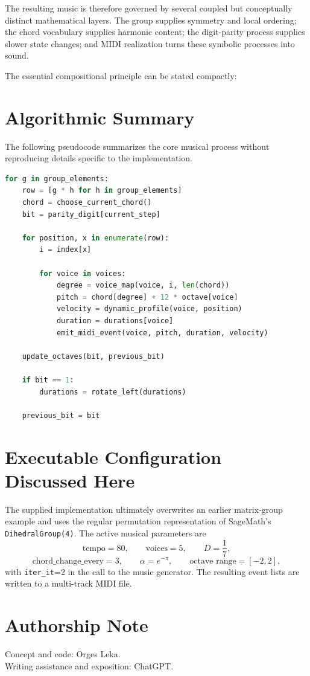 \documentclass[11pt,a4paper]{article}
\begin{document}
The resulting music is therefore governed by several coupled but conceptually distinct mathematical layers. The group supplies symmetry and local ordering; the chord vocabulary supplies harmonic content; the digit-parity process supplies slower state changes; and MIDI realization turns these symbolic processes into sound.

The essential compositional principle can be stated compactly:
\begin{center}
\end{center}

\appendix
\section{Algorithmic Summary}

The following pseudocode summarizes the core musical process without reproducing details specific to the implementation.

\begin{lstlisting}[language=Python]
for g in group_elements:
    row = [g * h for h in group_elements]
    chord = choose_current_chord()
    bit = parity_digit[current_step]

    for position, x in enumerate(row):
        i = index[x]

        for voice in voices:
            degree = voice_map(voice, i, len(chord))
            pitch = chord[degree] + 12 * octave[voice]
            velocity = dynamic_profile(voice, position)
            duration = durations[voice]
            emit_midi_event(voice, pitch, duration, velocity)

    update_octaves(bit, previous_bit)

    if bit == 1:
        durations = rotate_left(durations)

    previous_bit = bit
\end{lstlisting}

\section{Executable Configuration Discussed Here}

The supplied implementation ultimately overwrites an earlier matrix-group example and uses the regular permutation representation of SageMath's \texttt{DihedralGroup(4)}. The active musical parameters are
\[
\text{tempo}=80,\qquad
\text{voices}=5,\qquad
D=\frac17,
\]
\[
\text{chord\_change\_every}=3,\qquad
\alpha=e^{-\pi},\qquad
\text{octave range}=[-2,2],
\]
with \texttt{iter\_it}=2 in the call to the music generator. The resulting event lists are written to a multi-track MIDI file.

\section*{Authorship Note}

Concept and code: Orges Leka.\\
Writing assistance and exposition: ChatGPT.
\end{document}
